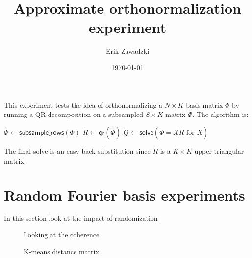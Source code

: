 \documentclass{article}
\title{Approximate orthonormalization experiment}
\author{Erik Zawadzki}
\date{\today}
\begin{document}
\maketitle

This experiment tests the idea of orthonormalizing a $N \times K$ basis matrix $\Phi$ by running a QR decomposition on a subsampled $S \times K$ matrix $\tilde \Phi$.
The algorithm is:

\begin{algorithm}
\begin{algorithmic}
\State $\tilde \Phi \gets \textsf{subsample\_rows}(\Phi)$
\State $\tilde R \gets \textsf{qr}(\tilde \Phi)$
\State $\tilde Q \gets \textsf{solve}(\Phi = X \tilde R \text{ for } X)$
\end{algorithmic}
\end{algorithm}
The final solve is an easy back substitution since $\tilde R$ is a $K \times K$ upper triangular matrix.

\section{Random Fourier basis experiments}
In this section look at the impact of randomization 


\begin{figure}[htbp]
\caption{Looking at the coherence}
\label{fig:approx_qr_coherence_vs_sampling}
\end{figure}

\begin{figure}[htbp]
\caption{K-means distance matrix}
\label{fig:approx_qr_coherence_vs_size}
\end{figure}
\end{document}
